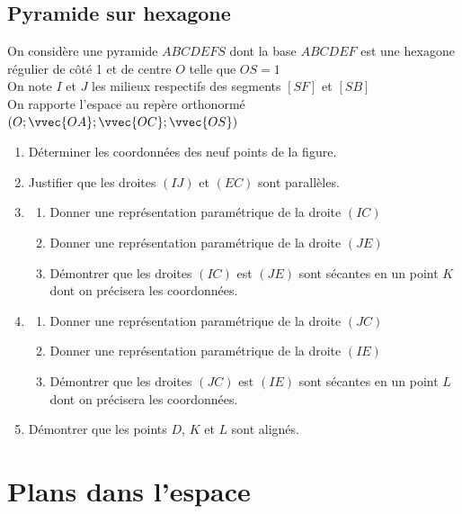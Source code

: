 \documentclass[oneside,12pt]{book}          %
\begin{document}
\subsection{Pyramide sur hexagone}
On considère une pyramide $ABCDEFS$ dont la base $ABCDEF$ est une hexagone régulier de côté 1 et de centre $O$ telle que $OS=1$\\
On note $I$ et $J$ les milieux respectifs des segments $[SF]$ et $[SB]$ \\
On rapporte l'espace au repère orthonormé $(O;\vvec{OA};\vvec{OC};\vvec{OS})$
\begin{enumerate}
    \item Déterminer les coordonnées des neuf points de la figure.
    \item Justifier que les droites $(IJ)$ et $(EC)$ sont parallèles.
    \item \begin{enumerate}
        \item Donner une représentation paramétrique de la droite $(IC)$
        \item Donner une représentation paramétrique de la droite $(JE)$
        \item Démontrer que les droites $(IC)$ est $(JE)$ sont sécantes en un point $K$ dont on précisera les coordonnées.
    \end{enumerate}
    \item \begin{enumerate}
        \item Donner une représentation paramétrique de la droite $(JC)$
        \item Donner une représentation paramétrique de la droite $(IE)$
        \item Démontrer que les droites $(JC)$ est $(IE)$ sont sécantes en un point $L$ dont on précisera les coordonnées.
    \end{enumerate}
    \item Démontrer que les points $D$, $K$ et $L$ sont alignés.
\end{enumerate}



\section{Plans dans l'espace}
\end{document}
